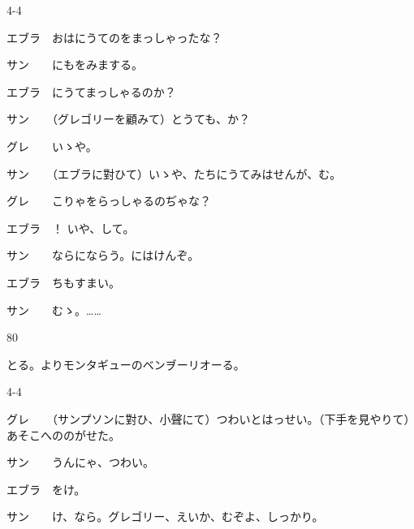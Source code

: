 \documentclass[tate,paper=b6j,jafontsize=9pt]{jlreq}
\begin{document}
\begin{azconvIndented}{4\zw}{-4\zw}

エブラ　おはにうてのをまっしゃったな？

サン　　にもをみまする。

エブラ　にうてまっしゃるのか？

サン　　（グレゴリーを顧みて）とうても、か？

グレ　　いゝや。

サン　　（エブラに對ひて）いゝや、たちにうてみはせんが、む。

グレ　　こりゃをらっしゃるのぢゃな？

エブラ　！ いや、して。

サン　　ならにならう。にはけんぞ。

エブラ　ちもすまい。

サン　　むゝ。……

\end{azconvIndented}
\begin{azconvIndented}{8\zw}{0\zw}

とる。よりモンタギューのベンヺーリオーる。

\end{azconvIndented}
\begin{azconvIndented}{4\zw}{-4\zw}

グレ　　（サンプソンに對ひ、小聲にて）つわいとはっせい。（下手を見やりて）あそこへののがせた。

サン　　うんにゃ、つわい。

エブラ　をけ。

サン　　け、なら。グレゴリー、えいか、むぞよ、しっかり。

\end{azconvIndented}
\end{document}
